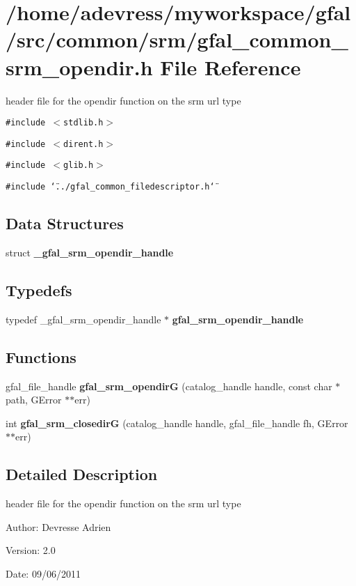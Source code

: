 \section{/home/adevress/myworkspace/gfal/src/common/srm/gfal\_\-common\_\-srm\_\-opendir.h File Reference}
\label{gfal__common__srm__opendir_8h}
header file for the opendir function on the srm url type 

{\tt \#include $<$stdlib.h$>$}\par
{\tt \#include $<$dirent.h$>$}\par
{\tt \#include $<$glib.h$>$}\par
{\tt \#include \char`\"{}../gfal\_\-common\_\-filedescriptor.h\char`\"{}}\par
\subsection*{Data Structures}
\begin{CompactItemize}
\item 
struct \textbf{\_\-gfal\_\-srm\_\-opendir\_\-handle}
\end{CompactItemize}
\subsection*{Typedefs}
\begin{CompactItemize}
\item 
typedef \_\-gfal\_\-srm\_\-opendir\_\-handle $\ast$ \textbf{gfal\_\-srm\_\-opendir\_\-handle}\label{gfal__common__srm__opendir_8h_824f5b93bbf97b9fed247ce0d6603a2c}

\end{CompactItemize}
\subsection*{Functions}
\begin{CompactItemize}
\item 
gfal\_\-file\_\-handle \textbf{gfal\_\-srm\_\-opendir\-G} (catalog\_\-handle handle, const char $\ast$path, GError $\ast$$\ast$err)\label{gfal__common__srm__opendir_8h_ab26f6c3cdedfa804b2f8d2fd300e9df}

\item 
int \textbf{gfal\_\-srm\_\-closedir\-G} (catalog\_\-handle handle, gfal\_\-file\_\-handle fh, GError $\ast$$\ast$err)\label{gfal__common__srm__opendir_8h_a9f63a5ff1be26668963f98f2fba9733}

\end{CompactItemize}


\subsection{Detailed Description}
header file for the opendir function on the srm url type 

\begin{Desc}
\item[Author:]Devresse Adrien \end{Desc}
\begin{Desc}
\item[Version:]2.0 \end{Desc}
\begin{Desc}
\item[Date:]09/06/2011 \end{Desc}
